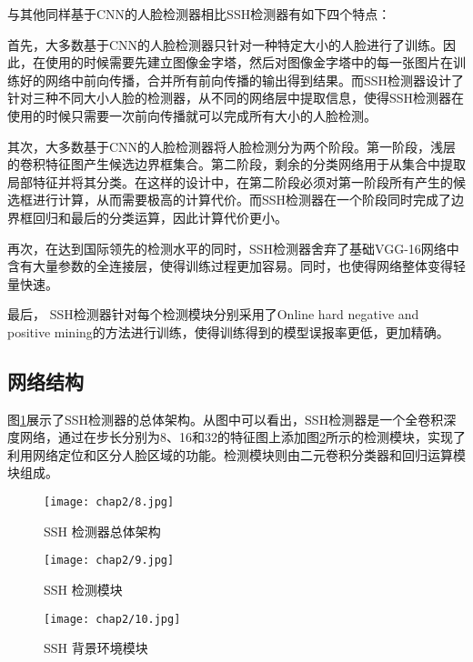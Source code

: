 与其他同样基于CNN的人脸检测器相比SSH检测器有如下四个特点：

首先，大多数基于CNN的人脸检测器只针对一种特定大小的人脸进行了训练。因此，在使用的时候需要先建立图像金字塔，然后对图像金字塔中的每一张图片在训练好的网络中前向传播，合并所有前向传播的输出得到结果。而SSH检测器设计了针对三种不同大小人脸的检测器，从不同的网络层中提取信息，使得SSH检测器在使用的时候只需要一次前向传播就可以完成所有大小的人脸检测。

其次，大多数基于CNN的人脸检测器将人脸检测分为两个阶段。第一阶段，浅层的卷积特征图产生候选边界框集合。第二阶段，剩余的分类网络用于从集合中提取局部特征并将其分类。在这样的设计中，在第二阶段必须对第一阶段所有产生的候选框进行计算，从而需要极高的计算代价。而SSH检测器在一个阶段同时完成了边界框回归和最后的分类运算，因此计算代价更小。

再次，在达到国际领先的检测水平的同时，SSH检测器舍弃了基础VGG-16网络\cite{simonyan2014very}中含有大量参数的全连接层，使得训练过程更加容易。同时，也使得网络整体变得轻量快速。

最后， SSH检测器针对每个检测模块分别采用了Online hard negative and positive mining\cite{shrivastava2016training}的方法进行训练，使得训练得到的模型误报率更低，更加精确。

\subsection{网络结构}

图\ref{fig:ssh:arc}\cite{najibi2017ssh}展示了SSH检测器的总体架构。从图中可以看出，SSH检测器是一个全卷积深度网络，通过在步长分别为8、16和32的特征图上添加图\ref{fig:ssh:det}\cite{najibi2017ssh}所示的检测模块，实现了利用网络定位和区分人脸区域的功能。检测模块则由二元卷积分类器和回归运算模块组成。

\begin{figure}[!htp]
	\centering
	\texttt{[image: chap2/8.jpg]}
	\caption{SSH 检测器总体架构\cite{najibi2017ssh}}
	\label{fig:ssh:arc}
\end{figure}

\begin{figure}[!htp]
	\centering
	\texttt{[image: chap2/9.jpg]}
	\caption{SSH 检测模块\cite{najibi2017ssh}}
	\label{fig:ssh:det}
\end{figure}

\begin{figure}[!htp]
	\centering
	\texttt{[image: chap2/10.jpg]}
	\caption{SSH 背景环境模块\cite{najibi2017ssh}}
	\label{fig:ssh:context}
\end{figure}

